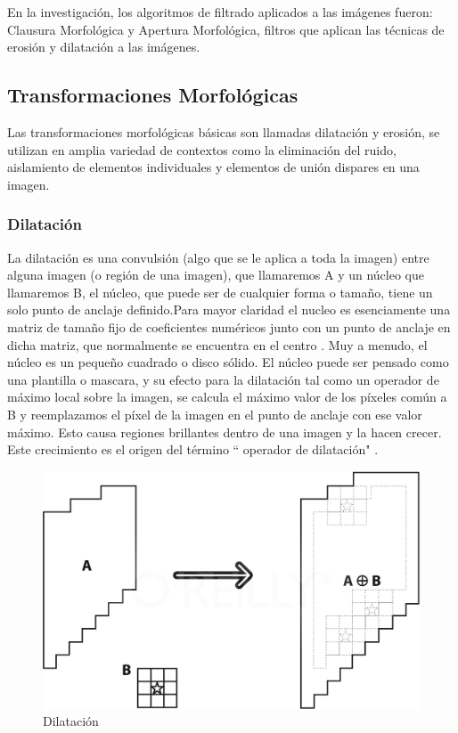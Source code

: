 En la investigación, los algoritmos de filtrado aplicados a las imágenes fueron: Clausura Morfológica y Apertura Morfológica, filtros que aplican las técnicas de erosión y dilatación a las imágenes.

\subsection{Transformaciones Morfológicas}
Las transformaciones morfológicas básicas son llamadas dilatación y erosión, se utilizan en 
amplia variedad de contextos como la eliminación del ruido, aislamiento de elementos individuales y elementos de unión dispares
en una imagen.\cite{BookOpenCv}

\subsubsection{Dilatación}
La dilatación es una convulsión (algo que se le aplica a toda la imagen) entre alguna imagen (o región de una imagen), que llamaremos A y un núcleo que llamaremos B, el núcleo, que puede ser de cualquier forma o tamaño, tiene un solo punto de anclaje definido.Para mayor claridad el nucleo es esenciamente una matriz de tamaño fijo  de coeficientes numéricos junto con un punto de anclaje en dicha matriz, que normalmente se encuentra en el centro . Muy  a menudo, el núcleo es un pequeño cuadrado o disco sólido. El núcleo puede ser pensado como una plantilla  o mascara, y su efecto para la dilatación tal como un operador de máximo local sobre la imagen, se calcula el m\'aximo valor de los píxeles común a B y reemplazamos el píxel de la imagen en el punto de anclaje con ese valor máximo. Esto causa regiones brillantes dentro de una imagen y la hacen crecer. Este crecimiento es el origen del término `` operador de dilatación" \cite{BookOpenCv}. 

\begin{figure}[hbtp]

\centering
\includegraphics[scale=0.2]{imagenes/erosion-model.png}
\caption{Dilatación}
\end{figure}


